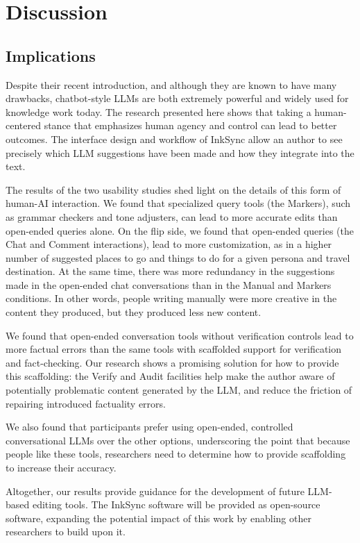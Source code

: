 \documentclass[manuscript]{acmart}
\begin{document}
\section{Discussion} \label{sec:discussion}

\subsection{Implications}

Despite their recent introduction, and although they are known to have many drawbacks, chatbot-style LLMs are both extremely powerful and widely used for knowledge work today. The research presented here shows that taking a human-centered stance that emphasizes human agency and control can lead to better outcomes. The interface design and workflow of InkSync allow an author to see precisely which LLM suggestions have been made and how they integrate into the text.

The results of the two usability studies shed light on the details of this form of human-AI interaction. We found that specialized query tools (the Markers), such as grammar checkers and tone adjusters, can lead to more accurate edits than open-ended queries alone. On the flip side, we found that open-ended queries (the Chat and Comment interactions), lead to more customization, as in a higher number of suggested places to go and things to do for a given persona and travel destination. At the same time, there was more redundancy in the suggestions made in the open-ended chat conversations than in the Manual and Markers conditions. In other words, people writing manually were more creative in the content they produced, but they produced less new content. 

We found that open-ended conversation tools without verification controls lead to more factual errors than the same tools with scaffolded support for verification and fact-checking. Our research shows a promising solution for how to provide this scaffolding: the Verify and Audit facilities help make the author aware of potentially problematic content generated by the LLM, and reduce the friction of repairing introduced factuality errors.

We also found that participants prefer using open-ended, controlled conversational LLMs over the other options, underscoring the point that because people like these tools, researchers need to determine how to provide scaffolding to increase their accuracy.

Altogether, our results provide guidance for the development of future LLM-based editing tools. The InkSync software will be provided as open-source software, expanding the potential impact of this work by enabling other researchers to build upon it.
\end{document}
